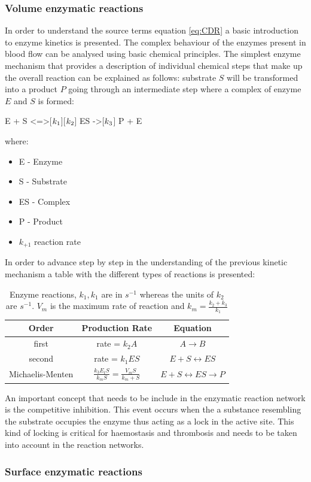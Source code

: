\documentclass[%
 nofootinbib,
 amsmath,amssymb,
 aps,
 pra,
]{revtex4-1}
\begin{document}
\subsubsection{Volume enzymatic reactions}
In order to understand the source terms equation \ref{eq:CDR} a basic introduction to enzyme kinetics is presented. The complex behaviour of the enzymes present in blood flow can be analysed using basic chemical principles. The simplest enzyme mechanism that provides a description of individual chemical steps that make up the overall reaction can be explained as follows: substrate $S$ will be transformed into a product $P$ going through an intermediate step where a complex of enzyme $E$ and $S$ is formed: 
\begin{reaction}
E + S <=>[$k\sb{1}$][$k\sb{2}$] ES ->[$k\sb{3}$] P + E
\end{reaction}
where:
\begin{itemize}
\item E - Enzyme 
\item S - Substrate
\item ES - Complex
\item P - Product
\item $k_{+1}$ reaction rate 
\end{itemize}
In order to advance step by step in the understanding of the previous kinetic mechanism a table with the different types of reactions is presented:\\
\begin{table}[h]
\begin{tabular}{c c c}
\hline
\textbf{Order} & \textbf{Production Rate} & \textbf{Equation} \\
\hline
first & rate = $k_{2} A  $ & $A \rightarrow B$ \\
second & rate = $k_{1} E S$ & $E + S \leftrightarrow ES $\\
Michaelis-Menten & $ \frac{k_{3} E_{t} S }{k_{m} S} = \frac{V_{m} S}{k_{m} + S} $ & $E + S \leftrightarrow ES \rightarrow P  $ \\
\hline  
\end{tabular}\caption{\label{tab:Enzyme} Enzyme reactions, $ k_{1}, k_{1}$ are in $s^{-1}$ whereas the units of $k_{2}$ are $s^{-1}$. $V_{m}$ is the maximum rate of reaction and $k_{m} = \frac{k_{2} + k_{3} }{k_{1}} $}
\end{table}
An important concept that needs to be include in the enzymatic reaction network is the competitive inhibition. This event occurs when the a substance resembling the substrate occupies the enzyme thus acting as a lock in the active site. This kind of locking is critical for haemostasis and thrombosis and needs to be taken into account in the reaction networks.\\
\subsubsection{Surface enzymatic reactions}


\end{document}

